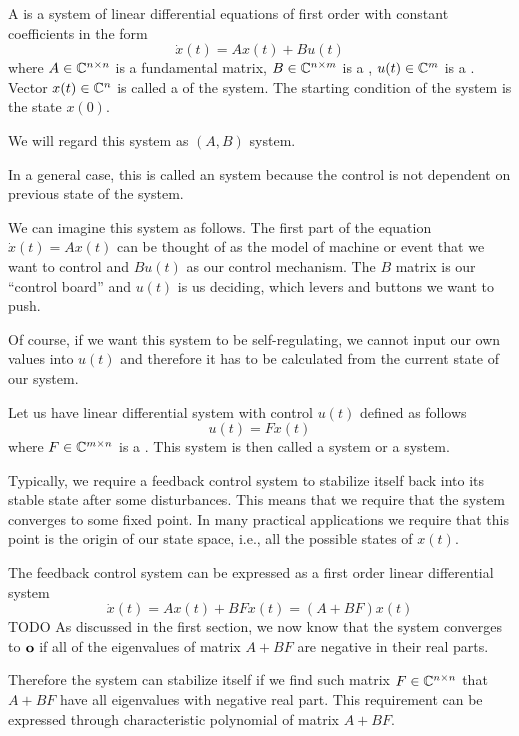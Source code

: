 \begin{definition}
	A  is a system of linear differential equations of first order with constant coefficients in the form $$\dot{x}(t)=Ax(t)+Bu(t)$$ where $A\in\mathbb{C}^{n\times n}$ is a fundamental matrix, $B\in\mathbb{C}^{n\times m}$ is a , $u(t)\in\mathbb{C}^m$ is a . Vector $x(t)\in\mathbb{C}^n$ is called a  of the system. The starting condition of the system is the state $x(0)$.

	We will regard this system as $(A,B)$ system.
\end{definition}

In a general case, this is called an  system because the control is not dependent on previous state of the system.

We can imagine this system as follows. The first part of the equation $\dot{x}(t)=Ax(t)$ can be thought of as the model of machine or event that we want to control and $Bu(t)$ as our control mechanism. The $B$ matrix is our ``control board'' and $u(t)$ is us deciding, which levers and buttons we want to push. 

Of course, if we want this system to be self-regulating, we cannot input our own values into $u(t)$ and therefore it has to be calculated from the current state of our system.

\begin{definition}
	Let us have linear differential system with control $u(t)$ defined as follows $$u(t)=Fx(t)$$ where $F\in\mathbb{C}^{m\times n}$ is a . This system is then called a  system or a  system.
\end{definition}

Typically, we require a feedback control system to stabilize itself back into its stable state after some disturbances. This means that we require that the system converges to some fixed point. In many practical applications we require that this point is the origin of our state space, i.e., all the possible states of $x(t)$.

The feedback control system can be expressed as a first order linear differential system $$\dot{x}(t)=Ax(t)+BFx(t)=(A+BF)x(t)$$ TODO As discussed in the first section, we now know that the system converges to $\textbf{o}$ if all of the eigenvalues of matrix $A+BF$ are negative in their real parts. 

Therefore the system can stabilize itself if we find such matrix $F \in \mathbb{C}^{n \times n}$ that $A+BF$ have all eigenvalues with negative real part. This requirement can be expressed through characteristic polynomial of matrix $A+BF$.

